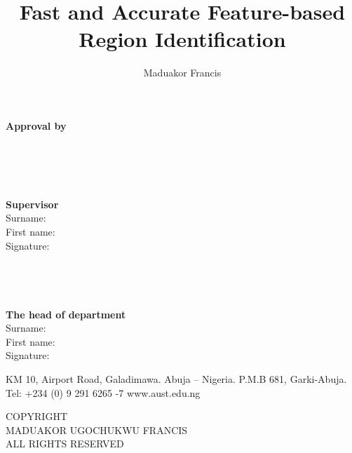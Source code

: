 \documentclass[final,a4paper]{aust_thesis}
\title{%
Fast and Accurate Feature-based Region Identification
}
\author{%
Maduakor Francis
}
\begin{document}
\begin{figure}[h]
	\centering
\end{figure}



\begin{center}
	\large\textbf{Approval by}
\end{center}
\leavevmode\\
\leavevmode\\
\leavevmode\\
\leavevmode\\
\noindent
\textbf{Supervisor}\\
Surname:\\
First name:\\
Signature:\\
\\
\\
\\
\\
\noindent
\textbf{The head of department}\\
Surname:\\
First name:\\
Signature:\\


\vspace*{\fill}
\begingroup
\begin{center}
	\tiny KM 10, Airport Road, Galadimawa. Abuja – Nigeria. P.M.B 681, Garki-Abuja. Tel: +234 (0) 9 291 6265 -7
	www.aust.edu.ng
\end{center}
\endgroup




\pagebreak
\vspace*{\fill}
\begingroup
\centering

COPYRIGHT \\
MADUAKOR UGOCHUKWU FRANCIS\\
ALL RIGHTS RESERVED\\

\endgroup
\end{document}
